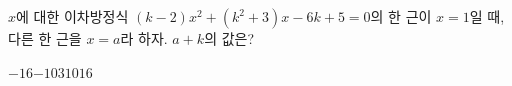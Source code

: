 $x$에 대한 이차방정식 $(k-2)x^2+(k^2+3)x-6k+5=0$의 한 근이 $x=1$일 때, 다른 한 근을 $x=a$라 하자. $a+k$의 값은? 
\begin{choices32}{$-16$}{$-10$}{$3$}{$10$}{$16$}\end{choices32}
